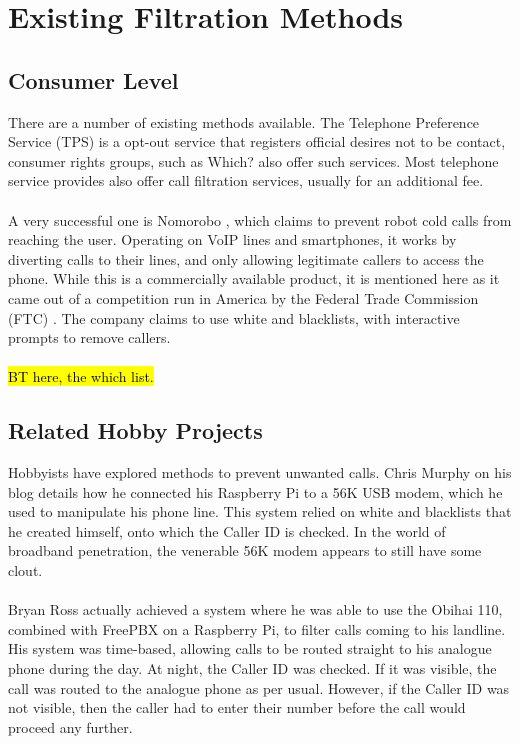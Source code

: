 \documentclass[main.tex]{subfiles}
\begin{document}
\section{Existing Filtration Methods}
\subsection{Consumer Level}
There are a number of existing methods available. The Telephone Preference Service (TPS) \cite{tps} is a opt-out service that registers official desires not to be contact, consumer rights groups, such as Which? \cite{which} also offer such services. Most telephone service provides also offer call filtration services, usually for an additional fee.
\\\\
A very successful one is Nomorobo \cite{nomorobo}, which claims to prevent robot cold calls from reaching the user. Operating on VoIP lines and smartphones, it works by diverting calls to their lines, and only allowing legitimate callers to access the phone. While this is a commercially available product, it is mentioned here as it came out of a competition run in America by the Federal Trade Commission (FTC) \cite{wired-nomorobo}. The company claims to use white and blacklists, with interactive prompts to remove callers.
\\\\
\hl{BT here, the which list. }

\subsection{Related Hobby Projects}
Hobbyists have explored methods to prevent unwanted calls. Chris Murphy on his blog \cite{murphy} details how he connected his Raspberry Pi to a 56K USB modem, which he used to manipulate his phone line. This system relied on white and blacklists that he created himself, onto which the Caller ID is checked. In the world of broadband penetration, the venerable 56K modem appears to still have some clout.
\\\\
Bryan Ross actually achieved a system where he was able to use the Obihai 110\cite{obihai110}, combined with FreePBX on a Raspberry Pi, to filter calls coming to his landline. His system was time-based, allowing calls to be routed straight to his analogue phone during the day. At night, the Caller ID was checked. If it was visible, the call was routed to the analogue phone as per usual. However, if the Caller ID was not visible, then the caller had to enter their number before the call would proceed any further.
\end{document}
